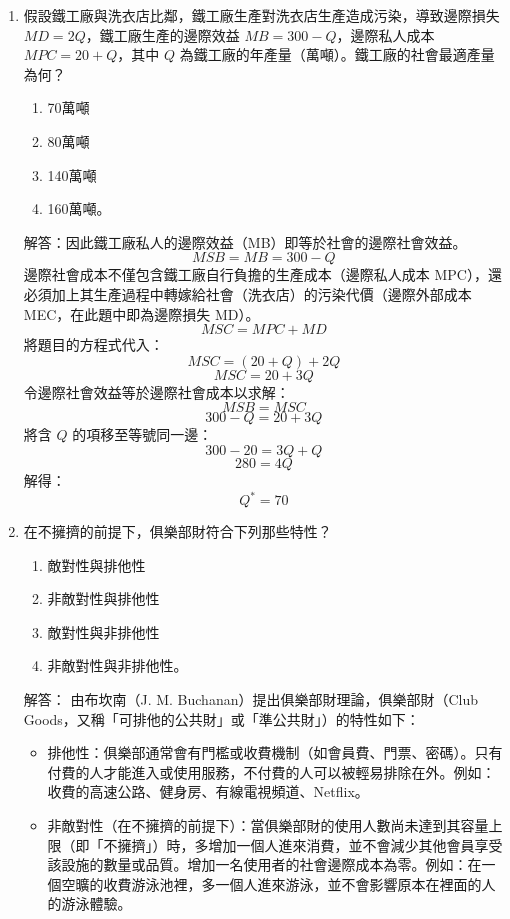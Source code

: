 \documentclass[12pt, a4paper]{article}
\begin{document}
\begin{enumerate}
    \item 假設鐵工廠與洗衣店比鄰，鐵工廠生產對洗衣店生產造成污染，導致邊際損失 \(MD=2Q\)，鐵工廠生產的邊際效益 \(MB=300-Q\)，邊際私人成本 \(MPC=20+Q\)，其中 \(Q\) 為鐵工廠的年產量（萬噸）。鐵工廠的社會最適產量為何？
    \begin{enumerate}[label=\Alph*.]
        \item 70萬噸
        \item 80萬噸
        \item 140萬噸
        \item 160萬噸。
    \end{enumerate}
    解答：因此鐵工廠私人的邊際效益（MB）即等於社會的邊際社會效益。
    \[
    MSB = MB = 300 - Q
    \]
    邊際社會成本不僅包含鐵工廠自行負擔的生產成本（邊際私人成本 MPC），還必須加上其生產過程中轉嫁給社會（洗衣店）的污染代價（邊際外部成本 MEC，在此題中即為邊際損失 MD）。
    \[
    MSC = MPC + MD
    \]
    將題目的方程式代入：
    \[
    MSC = (20 + Q) + 2Q
    \]
    \[
    MSC = 20 + 3Q
    \]
    令邊際社會效益等於邊際社會成本以求解：
    \[
    MSB = MSC
    \]
    \[
    300 - Q = 20 + 3Q
    \]
    將含 \(Q\) 的項移至等號同一邊：
    \[
    300 - 20 = 3Q + Q
    \]
    \[
    280 = 4Q
    \]
    解得：
    \[
    Q^* = 70
    \]

    \item 在不擁擠的前提下，俱樂部財符合下列那些特性？
    \begin{enumerate}[label=\Alph*.]
        \item 敵對性與排他性
        \item 非敵對性與排他性
        \item 敵對性與非排他性
        \item 非敵對性與非排他性。
    \end{enumerate}
    解答：
    由布坎南（J. M. Buchanan）提出俱樂部財理論，俱樂部財（Club Goods，又稱「可排他的公共財」或「準公共財」）的特性如下：
    \begin{itemize}
        \item 排他性：俱樂部通常會有門檻或收費機制（如會員費、門票、密碼）。只有付費的人才能進入或使用服務，不付費的人可以被輕易排除在外。例如：收費的高速公路、健身房、有線電視頻道、Netflix。
        \item 非敵對性（在不擁擠的前提下）：當俱樂部財的使用人數尚未達到其容量上限（即「不擁擠」）時，多增加一個人進來消費，並不會減少其他會員享受該設施的數量或品質。增加一名使用者的社會邊際成本為零。例如：在一個空曠的收費游泳池裡，多一個人進來游泳，並不會影響原本在裡面的人的游泳體驗。
    \end{itemize}


\end{enumerate}
\end{document}
